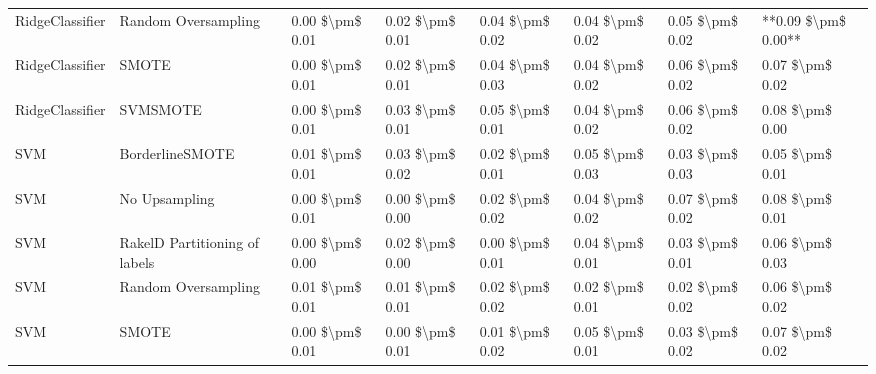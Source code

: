 \begin{tabular}{llllllll}
                RidgeClassifier &           Random Oversampling & 0.00 \$\textbackslash pm\$ 0.01 &           0.02 \$\textbackslash pm\$ 0.01 &       0.04 \$\textbackslash pm\$ 0.02 &        0.04 \$\textbackslash pm\$ 0.02 &                         0.05 \$\textbackslash pm\$ 0.02 & **0.09 \$\textbackslash pm\$ 0.00** \\
                RidgeClassifier &                         SMOTE & 0.00 \$\textbackslash pm\$ 0.01 &           0.02 \$\textbackslash pm\$ 0.01 &       0.04 \$\textbackslash pm\$ 0.03 &        0.04 \$\textbackslash pm\$ 0.02 &                         0.06 \$\textbackslash pm\$ 0.02 &     0.07 \$\textbackslash pm\$ 0.02 \\
                RidgeClassifier &                      SVMSMOTE & 0.00 \$\textbackslash pm\$ 0.01 &           0.03 \$\textbackslash pm\$ 0.01 &       0.05 \$\textbackslash pm\$ 0.01 &        0.04 \$\textbackslash pm\$ 0.02 &                         0.06 \$\textbackslash pm\$ 0.02 &     0.08 \$\textbackslash pm\$ 0.00 \\
                            SVM &               BorderlineSMOTE & 0.01 \$\textbackslash pm\$ 0.01 &           0.03 \$\textbackslash pm\$ 0.02 &       0.02 \$\textbackslash pm\$ 0.01 &        0.05 \$\textbackslash pm\$ 0.03 &                         0.03 \$\textbackslash pm\$ 0.03 &     0.05 \$\textbackslash pm\$ 0.01 \\
                            SVM &                 No Upsampling & 0.00 \$\textbackslash pm\$ 0.01 &           0.00 \$\textbackslash pm\$ 0.00 &       0.02 \$\textbackslash pm\$ 0.02 &        0.04 \$\textbackslash pm\$ 0.02 &                         0.07 \$\textbackslash pm\$ 0.02 &     0.08 \$\textbackslash pm\$ 0.01 \\
                            SVM & RakelD Partitioning of labels & 0.00 \$\textbackslash pm\$ 0.00 &           0.02 \$\textbackslash pm\$ 0.00 &       0.00 \$\textbackslash pm\$ 0.01 &        0.04 \$\textbackslash pm\$ 0.01 &                         0.03 \$\textbackslash pm\$ 0.01 &     0.06 \$\textbackslash pm\$ 0.03 \\
                            SVM &           Random Oversampling & 0.01 \$\textbackslash pm\$ 0.01 &           0.01 \$\textbackslash pm\$ 0.01 &       0.02 \$\textbackslash pm\$ 0.02 &        0.02 \$\textbackslash pm\$ 0.01 &                         0.02 \$\textbackslash pm\$ 0.02 &     0.06 \$\textbackslash pm\$ 0.02 \\
                            SVM &                         SMOTE & 0.00 \$\textbackslash pm\$ 0.01 &           0.00 \$\textbackslash pm\$ 0.01 &       0.01 \$\textbackslash pm\$ 0.02 &        0.05 \$\textbackslash pm\$ 0.01 &                         0.03 \$\textbackslash pm\$ 0.02 &     0.07 \$\textbackslash pm\$ 0.02 \\

\end{tabular}

